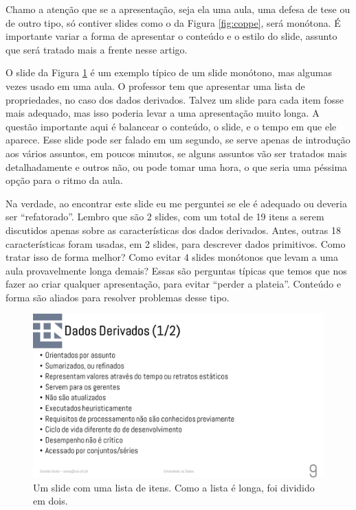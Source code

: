 Chamo a atenção que se a apresentação, seja ela uma aula, uma defesa de tese ou de outro tipo, só contiver slides como o da Figura \ref{fig:coppe},  será monótona. É importante variar a forma de apresentar o conteúdo e o estilo do slide, assunto que será tratado mais a frente nesse artigo.

O slide da Figura \ref{fig:dados} é um exemplo típico de um slide monótono, mas algumas vezes usado em uma aula. O professor tem que apresentar uma lista de propriedades, no caso dos dados derivados. Talvez um slide para cada item fosse mais adequado, mas isso poderia levar a uma apresentação muito longa. A questão importante aqui é balancear o conteúdo, o slide, e o tempo em que ele aparece. Esse slide pode ser falado em um segundo, se serve apenas de introdução aos vários assuntos, em poucos minutos, se alguns assuntos vão ser tratados mais detalhadamente e outros não, ou pode tomar uma hora, o que seria uma péssima opção para o ritmo da aula.

Na verdade, ao encontrar este slide eu me perguntei se ele é adequado ou deveria ser ``refatorado''. Lembro que são 2 slides, com um total de 19 itens a serem discutidos apenas sobre as características dos dados derivados. Antes, outras 18 características foram usadas, em 2 slides, para descrever dados primitivos. Como tratar isso de forma melhor? Como evitar 4 slides monótonos que levam a uma aula provavelmente longa demais? Essas são perguntas típicas que temos que nos fazer ao criar qualquer apresentação, para evitar ``perder a plateia''. Conteúdo e forma são aliados para resolver problemas desse tipo.

\begin{figure}[tbh]
    \centering
    \includegraphics[width=\tam\linewidth,frame]{imagens/dados}
    \caption{Um slide com uma lista de itens. Como a lista é longa, foi dividido em dois.}
    \label{fig:dados}
\end{figure}


